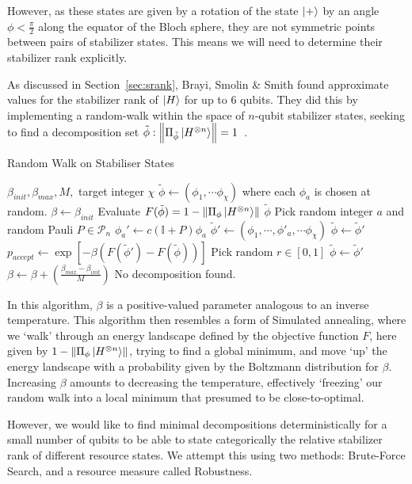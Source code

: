 \documentclass{standalone}
\begin{document}
However, as these states are given by a rotation of the state $\ket{+}$ by an angle $\phi<\frac{\pi}{2}$ along the equator of the Bloch sphere, they are not symmetric points between pairs of stabilizer states. This means we will need to determine their stabilizer rank explicitly. 
\par
As discussed in Section~\ref{sec:srank}, Brayi, Smolin \& Smith found approximate values for the stabilizer rank of $\ket{H}$ for up to $6$ qubits. They did this by implementing a random-walk within the space of $n$-qubit stabilizer states, seeking to find a decomposition set $\tilde{\phi}:\norm{\Pi_{\tilde{\phi}}\ket{H^{\otimes n}}}=1$~\cite{Bravyi2015}. \par
\begin{algorithm}[!h]
\caption{Random Walk on Stabiliser States}
\label{alg:randwalk}
\begin{algorithmic}[1]
\Require $\beta_{init},\beta_{max},M,$ target integer $\chi$
\State $\tilde{\phi} \leftarrow \left(\phi_{1},\cdots\phi_{\chi}\right)$ where each $\phi_{a}$ is chosen at random.
\State $\beta \leftarrow \beta_{init}$
        \State Evaluate $F(\tilde{\phi})=1-\norm{\Pi_{\phi}\ket{H^{\otimes n}}}$
            \State \Return $\tilde{\phi}$
        \EndIf
        \State Pick random integer $a$ and random Pauli $P\in\mathcal{P}_{n}$
        \State $\phi_{a}'\leftarrow c\left(\mathbb{I}+P\right)\phi_{a}$
        \State $\tilde{\phi}' \leftarrow (\phi_{1},\cdots,\phi'_{a},\cdots\phi_{\chi})$
            \State $\tilde{\phi}\leftarrow\tilde{\phi}'$
        \Else
            \State $p_{accept}\leftarrow \exp[-\beta\left(F(\tilde{\phi}')-F(\tilde{\phi})\right)]$
            \State Pick random $r\in [0,1]$
                \State $\tilde{\phi}\leftarrow\tilde{\phi}'$
            \EndIf
        \EndIf
    \EndFor
    \State $\beta\leftarrow \beta + \left( \frac{\beta_{max}-\beta_{init}}{M} \right)$
\EndWhile
\State \Return No decomposition found.
\end{algorithmic}
\end{algorithm}
In this algorithm, $\beta$ is a positive-valued parameter analogous to an inverse temperature. This algorithm then resembles a form of Simulated annealing, where we `walk' through an energy landscape defined by the objective function $F$, here given by $1-\norm{\Pi_{\phi}\ket{H^{\otimes n}}}$, trying to find a global minimum, and move `up' the energy landscape with a probability given by the Boltzmann distribution for $\beta$. Increasing $\beta$ amounts to decreasing the temperature, effectively `freezing' our random walk into a local minimum that presumed to be close-to-optimal.
\par
However, we would like to find minimal decompositions deterministically for a small number of qubits to be able to state categorically the relative stabilizer rank of different resource states. We attempt this using two methods: Brute-Force Search, and a resource measure called Robustness.
\end{document}
